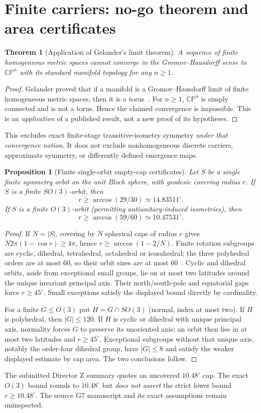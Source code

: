 \documentclass[10pt,letterpaper]{article}
\theoremstyle{plain}\newtheorem{theorem}{Theorem}\newtheorem{proposition}{Proposition}
\theoremstyle{definition}\newtheorem{remark}{Remark}
\begin{document}
\section{Finite carriers: no-go theorem and area certificates}
\begin{theorem}[Application of Gelander's limit theorem]\label{thm:gel}
A sequence of finite \emph{homogeneous} metric spaces cannot converge in the Gromov--Hausdorff sense to $\mathbb{CP}^n$ with its standard manifold topology for any $n\ge1$.
\end{theorem}
\begin{proof}
Gelander proved that if a manifold is a Gromov--Hausdorff limit of finite homogeneous metric spaces, then it is a torus~\cite{Gelander2013}. For $n\ge1$, $\mathbb{CP}^n$ is simply connected and is not a torus. Hence the claimed convergence is impossible. This is an \emph{application} of a published result, not a new proof of its hypotheses.
\end{proof}
This excludes exact finite-stage transitive-isometry symmetry \emph{under that convergence notion}. It does not exclude nonhomogeneous discrete carriers, approximate symmetry, or differently defined emergence maps.

\begin{proposition}[Finite single-orbit empty-cap certificates]
Let $S$ be a \emph{single finite symmetry orbit} on the unit Bloch sphere, with geodesic covering radius $r$. If $S$ is a finite $SO(3)$-orbit, then
\[
r\ge\arccos(29/30)\simeq14.83511^{\circ}.
\]
If $S$ is a finite $O(3)$-orbit (permitting antiunitary-induced isometries), then
\[
r\ge\arccos(59/60)\simeq10.47531^{\circ}.
\]
\end{proposition}
\begin{proof}
If $N=|S|$, covering by $N$ spherical caps of radius $r$ gives $N2\pi(1-\cos r)\ge4\pi$, hence $r\ge\arccos(1-2/N)$. Finite rotation subgroups are cyclic, dihedral, tetrahedral, octahedral or icosahedral; the three polyhedral orders are at most $60$, so their orbit sizes are at most $60$~\cite{EtingofNotes}. Cyclic and dihedral orbits, aside from exceptional small groups, lie on at most two latitudes around the unique invariant principal axis. Their north/south-pole and equatorial gaps force $r\ge45^\circ$. Small exceptions satisfy the displayed bound directly by cardinality.

For a finite $G\le O(3)$ put $H=G\cap SO(3)$ (normal, index at most two). If $H$ is polyhedral, then $|G|\le120$. If $H$ is cyclic or dihedral with unique principal axis, normality forces $G$ to preserve its unoriented axis; an orbit then lies in at most two latitudes and $r\ge45^\circ$. Exceptional subgroups without that unique axis, notably the order-four dihedral group, have $|G|\le8$ and satisfy the weaker displayed estimate by cap area. The two conclusions follow.
\end{proof}
The submitted Director Z summary quotes an uncovered $10.48^\circ$ cap. The exact $O(3)$ bound rounds to $10.48^\circ$ but \emph{does not assert} the strict lower bound $r\ge10.48^\circ$. The source G7 manuscript and its exact assumptions remain uninspected.
\end{document}
